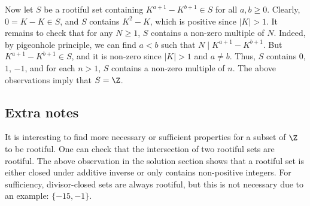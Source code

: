 Now let $S$ be a rootiful set containing $K^{a + 1} - K^{b + 1} \in S$ for all $a, b \geq 0$.
Clearly, $0 = K - K \in S$, and $S$ contains $K^2 - K$, which is positive since $|K| > 1$.
It remains to check that for any $N \geq 1$, $S$ contains a non-zero multiple of $N$.
Indeed, by pigeonhole principle, we can find $a < b$ such that $N \mid K^{a + 1} - K^{b + 1}$.
But $K^{a + 1} - K^{b + 1} \in S$, and it is non-zero since $|K| > 1$ and $a \neq b$.
Thus, $S$ contains $0$, $1$, $-1$, and for each $n > 1$, $S$ contains a non-zero multiple of $n$.
The above observations imply that $S = \Z$.



\subsection*{Extra notes}

It is interesting to find more necessary or sufficient properties for a subset of $\Z$ to be rootiful.
One can check that the intersection of two rootiful sets are rootiful.
The above observation in the solution section shows that a rootiful set is either closed under additive inverse or only contains non-positive integers.
For sufficiency, divisor-closed sets are always rootiful, but this is not necessary due to an example: $\{-15, -1\}$.
